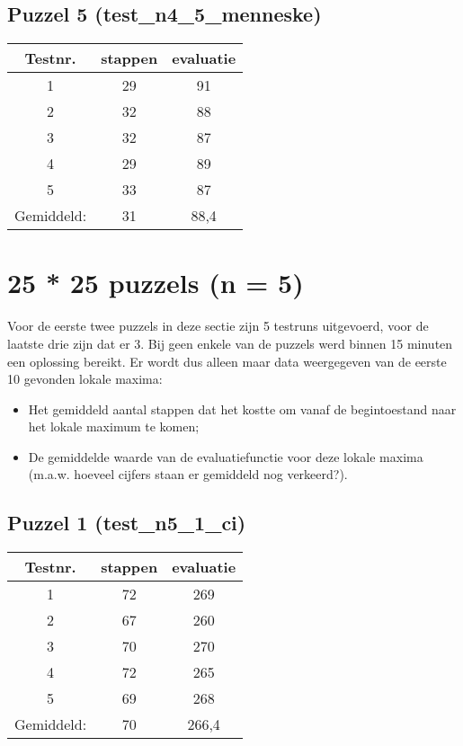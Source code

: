 \documentclass[]{report}
\begin{document}
\begin{appendices}
\subsection{Puzzel 5 (test\_n4\_5\_menneske)}
\begin{tabular}{|c||c|c|}
\hline Testnr. & stappen & evaluatie \\ 
\hline \hline 1 & 29 & 91 \\ 
\hline 2 & 32 & 88 \\ 
\hline 3 & 32 & 87 \\ 
\hline 4 & 29 & 89 \\ 
\hline 5 & 33 & 87 \\ 
\hline \hline Gemiddeld: & 31 & 88,4 \\ 
\hline 
\end{tabular} 

\section{25 * 25 puzzels (n = 5)}
Voor de eerste twee puzzels in deze sectie zijn 5 testruns uitgevoerd, voor de laatste drie zijn dat er 3. Bij geen enkele van de puzzels werd binnen 15 minuten een oplossing bereikt. Er wordt dus alleen maar data weergegeven van de eerste 10 gevonden lokale maxima:
\begin{itemize}
\item Het gemiddeld aantal stappen dat het kostte om vanaf de begintoestand naar het lokale maximum te komen;
\item De gemiddelde waarde van de evaluatiefunctie voor deze lokale maxima (m.a.w. hoeveel cijfers staan er gemiddeld nog verkeerd?).
\end{itemize}
\subsection{Puzzel 1 (test\_n5\_1\_ci)}
\begin{tabular}{|c||c|c|}
\hline Testnr. & stappen & evaluatie \\ 
\hline \hline 1 & 72 & 269 \\ 
\hline 2 & 67 & 260 \\ 
\hline 3 & 70 & 270 \\ 
\hline 4 & 72 & 265 \\ 
\hline 5 & 69 & 268 \\ 
\hline \hline Gemiddeld: & 70 & 266,4 \\ 
\hline 
\end{tabular} 

\end{appendices}
\end{document}
